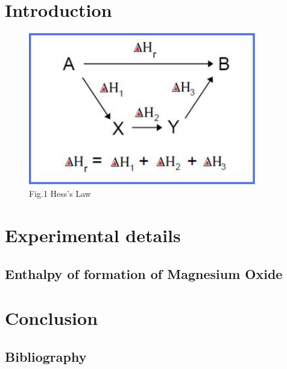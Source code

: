 \documentclass[12pt, twoside]{report}
\numberwithin{equation}{section}
\newcommand*\cleartoleftpage{%
  \clearpage
  \ifodd\value{page}\hbox{}\newpage\fi
}
\begin{document}
\chapter{Introduction}

\cleartoleftpage
\vspace*{6cm}
\begin{figure}[h]
  \begin{center}
    \includegraphics[width=10cm]{fig1}
    \end{center}
  \caption*{Fig.1 Hess's Law}
 \end{figure}
\cleardoublepage
\chapter{Experimental details}
\section{Enthalpy of formation of Magnesium Oxide}


\cleardoublepage
\chapter{Conclusion}

\section{Bibliography}

\end{document}
